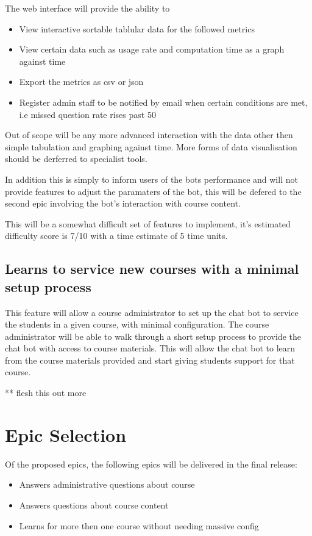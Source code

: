 \documentclass{article}
\begin{document}
The web interface will provide the ability to 
\begin{itemize}
  \item View interactive sortable tablular data for the followed metrics
  \item View certain data such as usage rate and computation time as a graph against time
  \item Export the metrics as csv or json
  \item Register admin staff to be notified by email when certain conditions are met, i.e missed question rate rises past 50%
\end{itemize}

Out of scope will be any more advanced interaction with the data other then simple tabulation and graphing against time. More forms of data visualisation should be derferred to specialist tools. 

In addition this is simply to inform users of the bots performance and will not provide features to adjust the paramaters of the bot, this will be defered to the second epic involving the bot's interaction with course content. 

This will be a somewhat difficult set of features to implement, it's estimated difficulty score is 7/10 with a time estimate of 5 time units.

\subsection{Learns to service new courses with a minimal setup process}

This feature will allow a course administrator to set up the chat bot to service the students in a given course, with minimal configuration.
The course administrator will be able to walk through a short setup process to provide the chat bot with access to course materials.
This will allow the chat bot to learn from the course materials provided and start giving students support for that course. 

** flesh this out more


\section{Epic Selection}

Of the proposed epics, the following epics will be delivered in the final release:
\begin{itemize}
  \item Answers administrative questions about course
  \item Answers questions about course content
  \item Learns for more then one course without needing massive config
\end{itemize}
\end{document}
